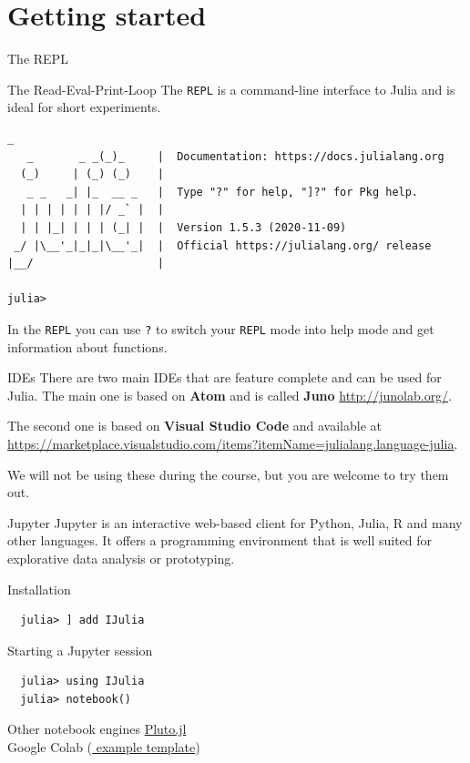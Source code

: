 \documentclass{beamer}
\begin{document}
\section{Getting started}
\begin{frame}[fragile]{The REPL}
  \begin{block}{The Read-Eval-Print-Loop}
    The \verb|REPL| is a command-line interface to Julia and is ideal for short experiments.
    \begin{Verbatim}[fontsize=\footnotesize]
               _
   _       _ _(_)_     |  Documentation: https://docs.julialang.org
  (_)     | (_) (_)    |
   _ _   _| |_  __ _   |  Type "?" for help, "]?" for Pkg help.
  | | | | | | |/ _` |  |
  | | |_| | | | (_| |  |  Version 1.5.3 (2020-11-09)
 _/ |\__'_|_|_|\__'_|  |  Official https://julialang.org/ release
|__/                   |

julia> 
\end{Verbatim}

In the \verb|REPL| you can use \verb|?| to switch your \verb|REPL| mode into help mode and get information about functions.
  \end{block}
\end{frame}
\begin{frame}{IDEs}
  There are two main IDEs that are feature complete and can be used for Julia. The main one is based on \textbf{Atom} and is called \textbf{Juno} \url{http://junolab.org/}.

\vspace{0.5cm}
  The second one is based on \textbf{Visual Studio Code }and available at \url{https://marketplace.visualstudio.com/items?itemName=julialang.language-julia}.

\vspace{0.5cm}
  We will not be using these during the course, but you are welcome to try them out.
\end{frame}
\begin{frame}[fragile]{Jupyter}
  Jupyter is an interactive web-based client for Python, Julia, R and many other languages.
  It offers a programming environment that is well suited for explorative data analysis or prototyping.
  \begin{block}{Installation}
  \begin{Verbatim}
  julia> ] add IJulia
    \end{Verbatim}
  \end{block}
  \begin{block}{Starting a Jupyter session}
    \begin{Verbatim}
  julia> using IJulia
  julia> notebook()
    \end{Verbatim}
  \end{block}
  \begin{block}{Other notebook engines}
    \href{https://github.com/fonsp/Pluto.jl}{\color{blue} Pluto.jl}\\
    Google Colab (\href{https://colab.research.google.com/github/ageron/julia_notebooks/blob/master/Julia_Colab_Notebook_Template.ipynb}{\color{blue} example template})
  \end{block}
\end{frame}
\end{document}
